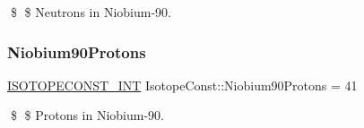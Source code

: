 \$ \$ Neutrons in Niobium-\/90. \mbox{\label{group___isotope_const-_niobium-_nb90_ga32360d329c167e207764dab05a875c90}} 
\subsubsection{\texorpdfstring{Niobium90\+Protons}{Niobium90Protons}}
{\footnotesize\ttfamily \mbox{\hyperlink{group___isotope_const-_macros_ga5f18360b3e99483a35c32d789e62621c}{I\+S\+O\+T\+O\+P\+E\+C\+O\+N\+S\+T\+\_\+\+I\+NT}} Isotope\+Const\+::\+Niobium90\+Protons = 41}

\$ \$ Protons in Niobium-\/90. 